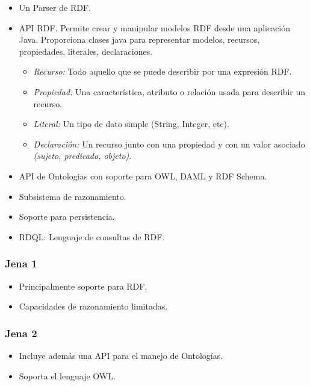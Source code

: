\documentclass[a4paper,10pt,spanish,oneside]{article}
\begin{document}
\begin{itemize}
\item Un Parser de RDF.

\item API RDF. Permite crear y manipular modelos RDF desde una aplicación Java. Proporciona clases java para representar modelos, recursos, propiedades, literales, declaraciones.

\begin{itemize}
\item \textit{Recurso:} Todo aquello que se puede describir por una expresión RDF.

\item \textit{Propiedad:} Una característica, atributo o relación usada para describir un recurso.

\item \textit{Literal:} Un tipo de dato simple (String, Integer, etc).

\item \textit{Declaración:} Un recurso junto con una propiedad y con un valor asociado \textit{(sujeto, predicado, objeto)}.
\end{itemize}

\item API de Ontologias con soporte para OWL, DAML y RDF Schema.

\item Subsistema de razonamiento.

\item Soporte para persistencia.

\item RDQL: Lenguaje de consultas de RDF.
\end{itemize}

\subsubsection{Jena 1}

\begin{itemize}
\item Principalmente soporte para RDF.
\item Capacidades de razonamiento limitadas.
\end{itemize}

\subsubsection{Jena 2}

\begin{itemize}
\item Incluye además una API para el manejo de Ontologías.
\item Soporta el lenguaje OWL.
\end{itemize}
\end{document}

